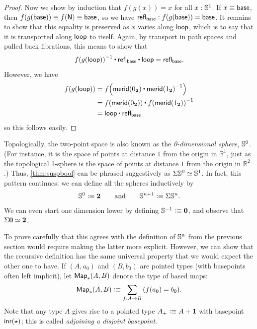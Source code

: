 \begin{proof}
  Now we show by induction that $f(g(x))=x$ for all $x:\mathbb{S}^1$.
  If $x\equiv \mathsf{base}$, then $f(g(\mathsf{base}))\equiv f(\mathsf{N})\equiv\mathsf{base}$, so we have $\mathsf{refl}_{\mathsf{base}} : f(g(\mathsf{base}))=\mathsf{base}$.
  It remains to show that this equality is preserved as $x$ varies along $\mathsf{loop}$, which is to say that it is transported along $\mathsf{loop}$ to itself.
  Again, by transport in path spaces and pulled back fibrations, this means to show that
  \[ \opp{\ap f {\ap g {\lloop}}} \ct \refl{\base} \ct \lloop = \refl{\base}.\]
  However, we have
  \begin{align*}
    \ap f {\ap g {\lloop}} &= \ap f {\merid(\bfalse) \ct \opp{\merid(\btrue)}}\\
    &= \ap f {\merid(\bfalse)} \ct \opp{\ap f {\merid(\btrue)}}\\
    &= \lloop \ct \refl{\base}
  \end{align*}
  so this follows easily.
\end{proof}

Topologically, the two-point space \bool is also known as the \emph{0-dimensional sphere}, $\mathbb{S}^0$.
(For instance, it is the space of points at distance $1$ from the origin in $\mathbb{R}^1$, just as the topological 1-sphere is the space of points at distance $1$ from the origin in $\mathbb{R}^2$.)
Thus, \cref{thm:suspbool} can be phrased suggestively as $\Sigma\mathbb{S}^0 \simeq \mathbb{S}^1$.
%
%
In fact, this pattern continues: we can define all the spheres inductively by
\begin{equation}\label{eq:Snsusp}
  \Sn^0 \defeq \bool
  \qquad\text{and}\qquad
  \Sn^{n+1} \defeq \susp \Sn^n.
\end{equation}
We can even start one dimension lower by defining $\mathbb{S}^{-1}\vcentcolon\equiv \mathbf{0}$, and observe that $\Sigma\mathbf{0} \simeq \mathbf{2}$.

To prove carefully that this agrees with the definition of $\mathbb{S}^n$ from the previous section would require making the latter more explicit.
However, we can show that the recursive definition has the same universal property that we would expect the other one to have.
If $(A,a_0)$ and $(B,b_0)$ are pointed types (with basepoints often left implicit), let $\mathsf{Map}_*(A,B)$ denote the type of based maps:
\[ \Map_*(A,B) \defeq \sm{f:A\to B} (f(a_0)=b_0). \]
Note that any type $A$ gives rise to a pointed type $A_+ \vcentcolon\equiv A+\mathbf{1}$ with basepoint ${\mathsf{inr}}(\star)$; this is called \emph{adjoining a disjoint basepoint}.
%
%
%

